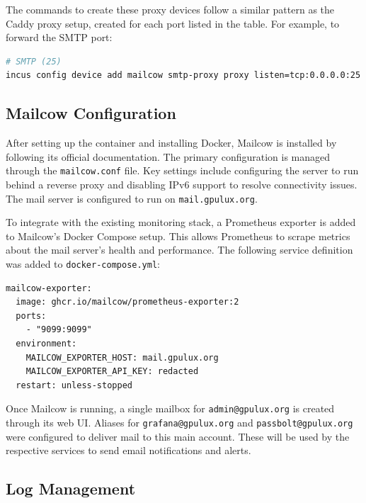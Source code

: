 The commands to create these proxy devices follow a similar pattern as the Caddy proxy setup, created for each port listed in the table. For example, to forward the SMTP port:

\begin{lstlisting}[language=bash,caption={Example of forwarding a port to the Mailcow container.}]
# SMTP (25)
incus config device add mailcow smtp-proxy proxy listen=tcp:0.0.0.0:25 connect=tcp:127.0.0.1:25
\end{lstlisting}

\subsection*{Mailcow Configuration}

After setting up the container and installing Docker, Mailcow is installed by following its official documentation\cite{mailcow-install}. The primary configuration is managed through the \texttt{mailcow.conf} file. Key settings include configuring the server to run behind a reverse proxy\cite{mailcow-reverse-proxy} and disabling IPv6 support to resolve connectivity issues\cite{mailcow-disable-ipv6}. The mail server is configured to run on \texttt{mail.gpulux.org}.

To integrate with the existing monitoring stack, a Prometheus exporter is added to Mailcow's Docker Compose setup. This allows Prometheus to scrape metrics about the mail server's health and performance. The following service definition was added to \texttt{docker-compose.yml}\cite{mailcow-prometheus-exporter}:

\begin{lstlisting}[caption={Docker Compose service for the Mailcow Prometheus exporter.}]
mailcow-exporter:
  image: ghcr.io/mailcow/prometheus-exporter:2
  ports:
    - "9099:9099"
  environment:
    MAILCOW_EXPORTER_HOST: mail.gpulux.org
    MAILCOW_EXPORTER_API_KEY: redacted
  restart: unless-stopped
\end{lstlisting}

Once Mailcow is running, a single mailbox for \texttt{admin@gpulux.org} is created through its web UI. Aliases for \texttt{grafana@gpulux.org} and \texttt{passbolt@gpulux.org} were configured to deliver mail to this main account. These will be used by the respective services to send email notifications and alerts.

\subsection*{Log Management}

